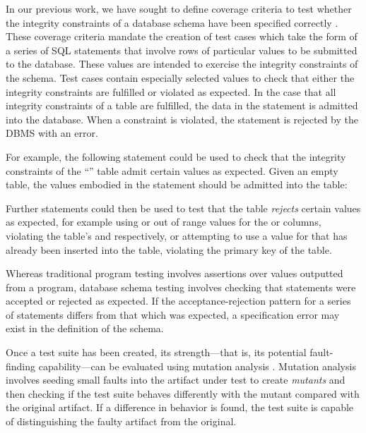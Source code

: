 In our previous work, we have sought to define coverage criteria to test whether the integrity constraints of a database schema have been specified correctly \cite{McMinn2015}. These coverage criteria mandate the creation of test cases which take the form of a series of SQL \INSERT statements that involve rows of particular values to be submitted to the database. These values are intended to exercise the integrity constraints of the schema. Test cases contain especially selected values to check that either the integrity constraints are fulfilled or violated as expected. In the case that all integrity constraints of a table are fulfilled, the data in the \INSERT statement is admitted into the database. When a constraint is violated, the \INSERT statement is rejected by the DBMS with an error.

For example, the following \INSERT statement could be used to check that the integrity constraints of the ``'' table admit certain values as expected. Given an empty table, the values embodied in the statement should be admitted into the table:

\vspace{-.25em}
\begin{center}
\end{center}
\vspace{-.25em}

Further \INSERT statements could then be used to test that the table {\it rejects} certain values as expected, for example using \NULL or out of range values for the  or  columns, violating the table's \NOTNULL and \CCs respectively, or attempting to use a value for  that has already been inserted into the table, violating the primary key of the table. 

Whereas traditional program testing involves assertions over values outputted from a program, database schema testing involves checking that \INSERT statements were accepted or rejected as expected. If the acceptance-rejection pattern for a series of \INSERT statements differs from that which was expected, a specification error may exist in the definition of the schema.

Once a test suite has been created, its strength---that is, its potential fault-finding capability---can be evaluated using mutation analysis \cite{Jia2011}. Mutation analysis involves seeding small faults into the artifact under test to create {\it mutants} and then checking if the test suite behaves differently with the mutant compared with the original artifact. If a difference in behavior is found, the test suite is capable of distinguishing the faulty artifact from the original.

